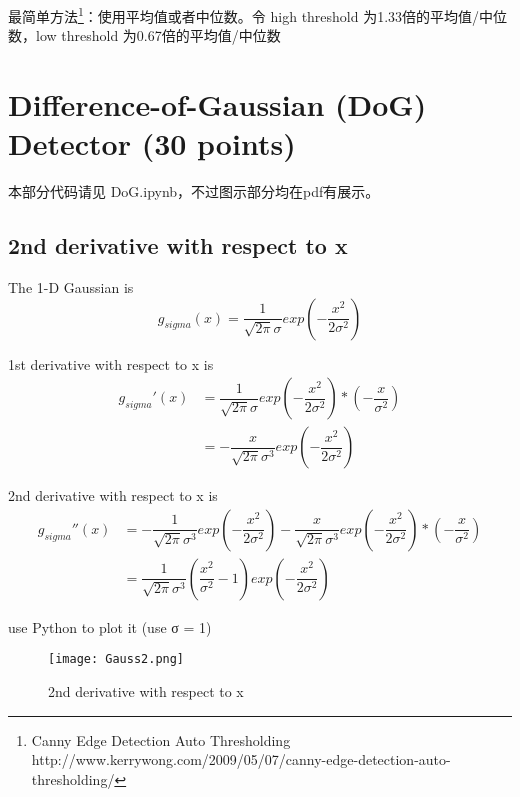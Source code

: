 \documentclass[a4paper,UTF8,11pt]{article}
\numberwithin{equation}{section}
\begin{document}
最简单方法\footnote{Canny Edge Detection Auto Thresholding http://www.kerrywong.com/2009/05/07/canny-edge-detection-auto-thresholding/}：使用平均值或者中位数。令 high threshold 为1.33倍的平均值/中位数，low threshold 为0.67倍的平均值/中位数




\newpage
\section{Difference-of-Gaussian (DoG) Detector (30 points)}
本部分代码请见 DoG.ipynb，不过图示部分均在pdf有展示。
\subsection{2nd derivative with respect to x}
The 1-D Gaussian is
\begin{equation*}
g_{sigma}(x)=\dfrac{1}{\sqrt{2\pi}\sigma}exp(-\dfrac{x^2}{2\sigma^2})
\end{equation*}

1st derivative with respect to x is
\begin{align*}
g_{sigma}'(x)&=\dfrac{1}{\sqrt{2\pi}\sigma}exp(-\dfrac{x^2}{2\sigma^2})*(-\dfrac{x}{\sigma^2})\\
&=-\dfrac{x}{\sqrt{2\pi}\sigma^3}exp(-\dfrac{x^2}{2\sigma^2})
\end{align*}

2nd derivative with respect to x is
\begin{align*}
g_{sigma}''(x)&=-\dfrac{1}{\sqrt{2\pi}\sigma^3}exp(-\dfrac{x^2}{2\sigma^2})-\dfrac{x}{\sqrt{2\pi}\sigma^3}exp(-\dfrac{x^2}{2\sigma^2})*(-\dfrac{x}{\sigma^2})\\
&=\dfrac{1}{\sqrt{2\pi}\sigma^3}(\dfrac{x^2}{\sigma^2}-1)exp(-\dfrac{x^2}{2\sigma^2})
\end{align*}

use Python to plot it (use σ = 1)
	\begin{figure}[h]
		\centering  %
		\texttt{[image: Gauss2.png]}  %
		\caption{2nd derivative with respect to x }  %
	\end{figure}
	
	
\end{document}
